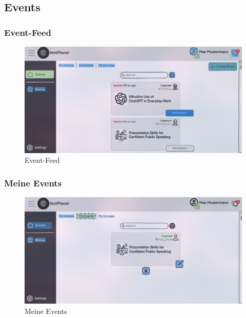 \documentclass[a4paper,12pt]{article}
\begin{document}
\subsection{Events}
\subsubsection{Event-Feed}
\begin{figure}[H]
    \centering
    \includegraphics[width=1\textwidth]{Abbildungen/events/event_feed.png}
    \caption{Event-Feed}
    \label{fig:event_Feed}
  \end{figure}
\subsubsection{Meine Events}
\begin{figure}[H]
    \centering
    \includegraphics[width=1\textwidth]{Abbildungen/events/my_events.png}
    \caption{Meine Events}
    \label{fig:my_events}
  \end{figure}
\end{document}
